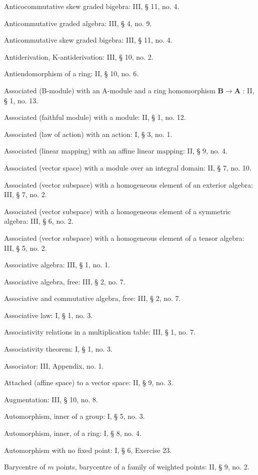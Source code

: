 Anticocommutative skew graded bigebra: III, § 11, no. 4.

Anticommutative graded algebra: III, § 4, no. 9.

Anticommutative skew graded bigebra: III, § 11, no. 4.

Antiderivation, K-antiderivation: III, § 10, no. 2.

Antiendomorphism of a ring: II, § 10, no. 6.

Associated (B-module) with an A-module and a ring homomorphism \(\mathbf{B} \to \mathbf{A}\) : II, § 1, no. 13.

Associated (faithful module) with a module: II, § 1, no. 12.

Associated (law of action) with an action: I, § 3, no. 1.

Associated (linear mapping) with an affine linear mapping: II, § 9, no. 4.

Associated (vector space) with a module over an integral domain: II, § 7, no. 10.

Associated (vector subspace) with a homogeneous element of an exterior algebra: III, § 7, no. 2.

Associated (vector subspace) with a homogeneous element of a symmetric algebra: III, § 6, no. 2.

Associated (vector subspace) with a homogeneous element of a tensor algebra: III, § 5, no. 2.

Associative algebra: III, § 1, no. 1.

Associative algebra, free: III, § 2, no. 7.

Associative and commutative algebra, free: III, § 2, no. 7.

Associative law: I, § 1, no. 3.

Associativity relations in a multiplication table: III, § 1, no. 7.

Associativity theorem: I, § 1, no. 3.

Associator: III, Appendix, no. 1.

Attached (affine space) to a vector space: II, § 9, no. 3.

Augmentation: III, § 10, no. 8.

Automorphism, inner of a group: I, § 5, no. 3.

Automorphism, inner, of a ring: I, § 8, no. 4.

Automorphism with no fixed point: I, § 6, Exercise 23.

Barycentre of \(m\) points, barycentre of a family of weighted points: II, § 9, no. 2.

